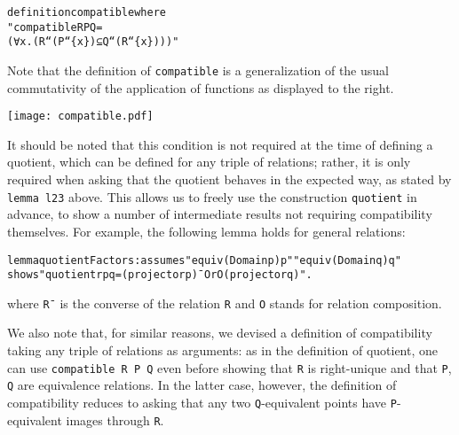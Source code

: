 \documentclass[
]{llncs}
\newenvironment{mytable}{
\vspace{0.2ex}
\begin{center}\begin{minipage}
{0.9\textwidth}\renewcommand{\baselinestretch}{0.75}\begin{small}}
{\end{small}\end{minipage}\end{center}
\vspace{0.1ex}
}
\begin{document}
\noindent\begin{minipage}{0.6\textwidth}
\begin{mytable}
\begin{alltt}
definition compatible where  
"compatible R P Q =
 (∀ x . (R``(P``\{x\}) ⊆ Q``(R``\{x\})))"
\end{alltt}\end{mytable}

Note that the definition of \verb|compatible| is a generalization of the usual commutativity of the application of functions as displayed to the right.
\end{minipage}\qquad
\begin{minipage}{0.35\textwidth}
\texttt{[image: compatible.pdf]}
\end{minipage}\bigskip{}

It should be noted that 
this condition is not required at the time of defining a quotient, which can be defined for any triple of relations;  
rather, it is only required when asking that the quotient behaves in the expected way, as stated by \verb|lemma l23| above.
This allows us to freely use the construction \verb|quotient| in advance, to show a number of intermediate results not requiring compatibility themselves. For example, the following lemma holds for general relations:



\begin{small}
\begin{alltt}
lemma quotientFactors: assumes "equiv (Domain p) p" "equiv (Domain q) q"
shows "quotient r p q = (projector p)¯ O r O (projector q)".
\end{alltt}
\end{small}
where \verb|R¯| is the converse of the relation \verb|R| and \verb|O| stands for relation composition.

We also note that, for similar reasons, we devised a definition of compatibility taking any triple of relations as arguments: as in the definition of quotient, one can use \verb|compatible R P Q| even before showing that \verb|R| is right-unique and that \verb|P|, \verb|Q| are equivalence relations.
In the latter case, however, the definition of compatibility reduces to asking that any two \verb|Q|-equivalent points have \verb|P|-equivalent images through \verb|R|.
\end{document}
